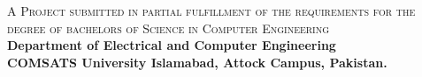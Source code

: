 \begin{titlepage}
\begin{center}
\vfill

\textsc{A Project submitted in partial fulfillment of the requirements for the degree of bachelors of Science in Computer Engineering}\\[1cm]


{ \large \bfseries Department of Electrical and Computer Engineering} \\[0.2cm]
{ \large \bfseries COMSATS University Islamabad, Attock Campus, Pakistan.} \\[0.2cm]



\thispagestyle{empty}
\end{center}
\end{titlepage}
